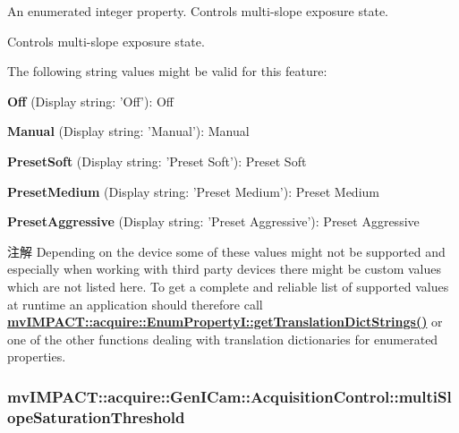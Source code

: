 An enumerated integer property. Controls multi-\/slope exposure state. 

Controls multi-\/slope exposure state.

The following string values might be valid for this feature\+:
\begin{DoxyItemize}
\item {\bfseries Off} (Display string\+: 'Off')\+: Off
\item {\bfseries Manual} (Display string\+: 'Manual')\+: Manual
\item {\bfseries Preset\+Soft} (Display string\+: 'Preset Soft')\+: Preset Soft
\item {\bfseries Preset\+Medium} (Display string\+: 'Preset Medium')\+: Preset Medium
\item {\bfseries Preset\+Aggressive} (Display string\+: 'Preset Aggressive')\+: Preset Aggressive
\end{DoxyItemize}

\begin{DoxyNote}{注解}
Depending on the device some of these values might not be supported and especially when working with third party devices there might be custom values which are not listed here. To get a complete and reliable list of supported values at runtime an application should therefore call {\bfseries \hyperlink{classmv_i_m_p_a_c_t_1_1acquire_1_1_enum_property_i_a0ba6ccbf5ee69784d5d0b537924d26b6}{mv\+I\+M\+P\+A\+C\+T\+::acquire\+::\+Enum\+Property\+I\+::get\+Translation\+Dict\+Strings()}} or one of the other functions dealing with translation dictionaries for enumerated properties. 
\end{DoxyNote}
\hypertarget{classmv_i_m_p_a_c_t_1_1acquire_1_1_gen_i_cam_1_1_acquisition_control_a6e6415c2be2fd0e16314ed053bdae6bd}{
\subsubsection[{multi\+Slope\+Saturation\+Threshold}]{ mv\+I\+M\+P\+A\+C\+T\+::acquire\+::\+Gen\+I\+Cam\+::\+Acquisition\+Control\+::multi\+Slope\+Saturation\+Threshold}}\label{classmv_i_m_p_a_c_t_1_1acquire_1_1_gen_i_cam_1_1_acquisition_control_a6e6415c2be2fd0e16314ed053bdae6bd}



